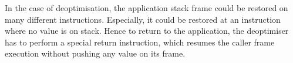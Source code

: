 \documentclass[a4paper,12pt,twoside]{../includes/ThesisStyle}
\begin{document}
In the case of deoptimisation, the application stack frame could be restored on many different instructions. Especially, it could be restored at an instruction where no value is on stack. Hence to return to the application, the deoptimiser has to perform a special return instruction, which resumes the caller frame execution without pushing any value on its frame.




\ifx\wholebook\relax\else
    
\end{document}
